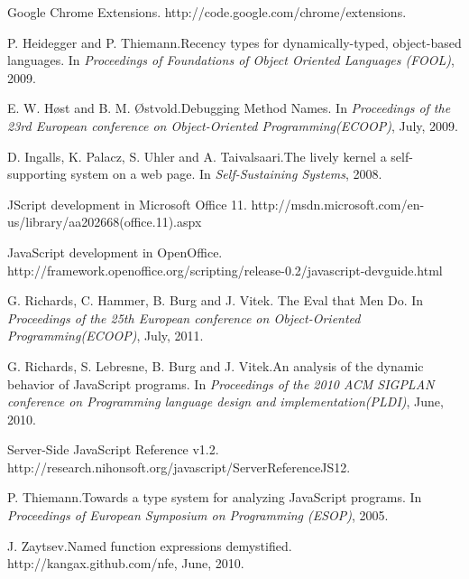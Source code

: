 \documentclass[10pt, preprint]{sigplanconf}
\begin{document}
\begin{thebibliography}{}
Google Chrome Extensions.
\newblock http://code.google.com/chrome/extensions.

P. Heidegger and P. Thiemann.\newblock Recency types for dynamically-typed, object-based languages.
\newblock In \emph{Proceedings of Foundations of Object Oriented Languages (FOOL)},
2009.

E. W. H{\o}st and  B. M. {\O}stvold.\newblock Debugging Method Names.
\newblock In \emph{Proceedings of the 23rd European conference on Object-Oriented Programming(ECOOP)},
July, 2009.

D. Ingalls, K. Palacz, S. Uhler and A. Taivalsaari.\newblock The lively kernel a self-supporting system on
a web page.
\newblock In \emph{Self-Sustaining Systems},
2008.

JScript development in Microsoft Office 11.
\newblock http://msdn.microsoft.com/en-us/library/aa202668(office.11).aspx

JavaScript development in OpenOffice.
\newblock http://framework.openoffice.org/scripting/release-0.2/javascript-devguide.html

G. Richards, C. Hammer, B. Burg and J. Vitek. \newblock The Eval that Men Do.
\newblock In \emph{Proceedings of the 25th European conference on Object-Oriented Programming(ECOOP)},
July, 2011.

G. Richards, S. Lebresne, B. Burg and J. Vitek.\newblock An analysis of the dynamic behavior of JavaScript programs.
\newblock In \emph{Proceedings of the 2010 ACM SIGPLAN conference on Programming language design and implementation(PLDI)},
June, 2010.

Server-Side JavaScript Reference v1.2.
\newblock http://research.nihonsoft.org/javascript/ServerReferenceJS12.

P. Thiemann.\newblock Towards a type system for analyzing JavaScript programs.
\newblock In \emph{Proceedings of European Symposium on Programming (ESOP)},
2005.

J. Zaytsev.\newblock Named function expressions demystified.
\newblock http://kangax.github.com/nfe,
June, 2010.


\end{thebibliography}
\end{document}
